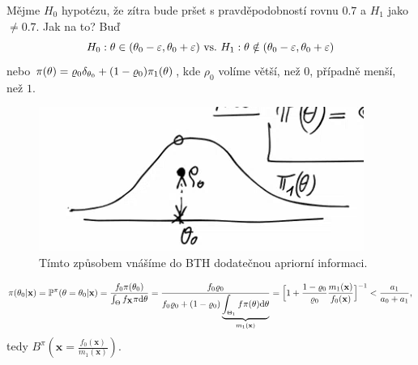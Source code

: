 \begin{example}
	Mějme $H_0$ hypotézu, že zítra bude pršet s pravděpodobností rovnu $0.7$ a $H_1$ jako $\neq 0.7$. Jak na to? Buď $$H_0: \theta\in(\theta_0-\varepsilon,\theta_0+\varepsilon) ~\text{vs.}~ H_1: \theta\notin(\theta_0-\varepsilon,\theta_0+\varepsilon)$$
	nebo $\pi(\theta)=\varrho_0 \delta_{\theta_0}+(1-\varrho_0)\pi_1(\theta)$, kde $\rho_0$ volíme větší, než $0$, případně menší, než $1$.
	
	\begin{figure}[h]
		\centering
		\includegraphics[width=0.5\linewidth]{pictures/last1}
		\caption{Tímto způsobem vnášíme do BTH dodatečnou apriorní informaci.}
		\label{fig:last1}
	\end{figure}
$$ \pi(\theta_0|\textbf{x})=\mathbb{P}^\pi(\theta=\theta_0|\textbf{x})=\frac{f_0\pi(\theta_0)}{\int_\Theta f_{\textbf{X}} \pi\mathrm{d}\theta}=\frac{f_0\varrho_0}{f_0\varrho_0+(1-\varrho_0)\underbrace{\int_{\Theta_1}f\pi(\theta)\mathrm{d}\theta}_{m_1(\textbf{x})}}=\Big[1+\frac{1-\varrho_0}{\varrho_0}\frac{m_1(\textbf{x})}{f_0(\textbf{x})}\Big]^{-1}<\frac{a_1}{a_0+a_1},$$
tedy $B^\pi(\textbf{x}=\frac{f_0(\textbf{x})}{m_1(\textbf{x})})$.
\end{example}
